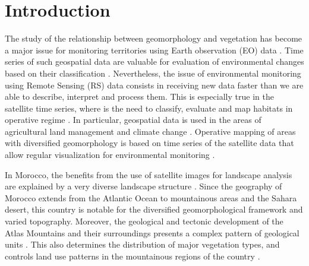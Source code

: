 \documentclass[geomatics,article,submit,pdftex,moreauthors]{Definitions/mdpi}
\begin{document}
\section{Introduction}

The study of the relationship between geomorphology and vegetation has become a major issue for monitoring territories using Earth observation (EO) data \cite{Corenblit,Muir,Pu,Cary01091990}. Time series of such geospatial data are valuable for evaluation of environmental changes based on their classification \cite{rs15225374,w17010068,app15010338}. Nevertheless, the issue of environmental monitoring using Remote Sensing (RS) data consists in receiving new data faster than we are able to describe, interpret and process them. This is especially true in the satellite time series, where is the need to classify, evaluate and map habitats in operative regime \cite{rs15225413,rs15225408,rs15225415}. In particular, geospatial data is used in the areas of agricultural land management and climate change \cite{Ahmadian03052016,Lemenkova202412,IMTIAZ2024109172}. Operative mapping of areas with diversified geomorphology is based on time series of the satellite data that allow regular visualization for environmental monitoring \cite{JOHANSSON01011978,rs9121306}.  

In Morocco, the benefits from the use of satellite images for landscape analysis are explained by a very diverse landscape structure \cite{Sahrane13122022,Marco04032021,Aouraghe01032010}. Since the geography of Morocco extends from the Atlantic Ocean to mountainous areas and the Sahara desert, this country is notable for the diversified geomorphological framework and varied topography. Moreover, the geological and tectonic development of the Atlas Mountains and their surroundings presents a complex pattern of geological units \cite{Benvenuti31122024,Ouallali03072020,Khalloufi01032010}. This also determines the distribution of major vegetation types, and controls land use patterns in the mountainous regions of the country \cite{ALIELOMAIRI2024101321}. 
\end{document}

